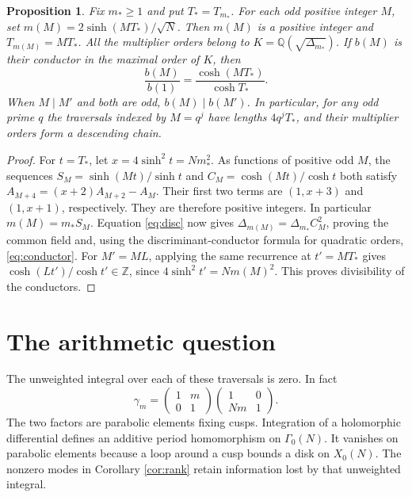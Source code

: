 \documentclass[11pt]{article}
\newtheorem{proposition}[theorem]{Proposition}
\newcommand{\Z}{\mathbb Z}
\newcommand{\Q}{\mathbb Q}
\begin{document}
\begin{proposition}\label{prop:nesting}
Fix \(m_*\ge1\) and put \(T_*=T_{m_*}\). For each odd positive integer
\(M\), set \(m(M)=2\sinh(MT_*)/\sqrt N\). Then \(m(M)\) is a positive
integer and \(T_{m(M)}=MT_*\). All the multiplier orders belong to
\(K=\Q(\sqrt{\Delta_{m_*}})\). If \(b(M)\) is their conductor in the
maximal order of \(K\), then
\begin{equation}
 \frac{b(M)}{b(1)}=\frac{\cosh(MT_*)}{\cosh T_*}.
 \label{eq:conductor}
\end{equation}
When \(M\mid M'\) and both are odd, \(b(M)\mid b(M')\). In particular,
for any odd prime \(q\) the traversals indexed by \(M=q^j\) have lengths
\(4q^j T_*\), and their multiplier orders form a descending chain.
\end{proposition}

\begin{proof}
For \(t=T_*\), let \(x=4\sinh^2t=Nm_*^2\). As functions of positive odd
\(M\), the sequences \(S_M=\sinh(Mt)/\sinh t\) and
\(C_M=\cosh(Mt)/\cosh t\) both satisfy
\(A_{M+4}=(x+2)A_{M+2}-A_M\). Their first two terms are
\((1,x+3)\) and \((1,x+1)\), respectively. They are therefore positive
integers. In particular \(m(M)=m_* S_M\). Equation \eqref{eq:disc} now
gives \(\Delta_{m(M)}=\Delta_{m_*}C_M^2\), proving the common field and,
using the discriminant-conductor formula for quadratic orders,
\eqref{eq:conductor}. For \(M'=ML\), applying the same recurrence at
\(t'=MT_*\) gives \(\cosh(Lt')/\cosh t'\in\Z\), since
\(4\sinh^2 t'=Nm(M)^2\). This proves divisibility of the conductors.
\end{proof}

\section{The arithmetic question}

The unweighted integral over each of these traversals is zero. In fact
\[
 \gamma_m=
 \begin{pmatrix}1&m\\0&1\end{pmatrix}
 \begin{pmatrix}1&0\\Nm&1\end{pmatrix}.
\]
The two factors are parabolic elements fixing cusps. Integration of a
holomorphic differential defines an additive period homomorphism on
\(\Gamma_0(N)\). It vanishes on parabolic elements because a loop around
a cusp bounds a disk on \(X_0(N)\). The nonzero modes in
Corollary \ref{cor:rank} retain information lost by that unweighted integral.
\end{document}
